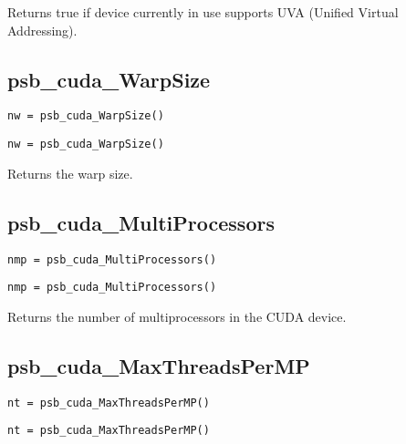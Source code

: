 Returns true if device currently in use supports UVA
(Unified Virtual Addressing).

\subsection*{psb\_cuda\_WarpSize }

\ifpdf
\begin{verbatim}
nw = psb_cuda_WarpSize()
\end{verbatim}
\else
\begin{center}
    \begin{minipage}[tl]{0.9\textwidth}
\begin{verbatim} 
nw = psb_cuda_WarpSize()
\end{verbatim}
    \end{minipage}
  \end{center}
\fi

Returns the warp size.


\subsection*{psb\_cuda\_MultiProcessors }

\ifpdf
\begin{verbatim}
nmp = psb_cuda_MultiProcessors()
\end{verbatim}
\else
\begin{center}
    \begin{minipage}[tl]{0.9\textwidth}
\begin{verbatim} 
nmp = psb_cuda_MultiProcessors()
\end{verbatim}
    \end{minipage}
  \end{center}
\fi

Returns the number of multiprocessors in the CUDA device.

\subsection*{psb\_cuda\_MaxThreadsPerMP }

\ifpdf
\begin{verbatim}
nt = psb_cuda_MaxThreadsPerMP()
\end{verbatim}
\else
\begin{center}
    \begin{minipage}[tl]{0.9\textwidth}
\begin{verbatim} 
nt = psb_cuda_MaxThreadsPerMP()
\end{verbatim}
    \end{minipage}
  \end{center}
\fi

